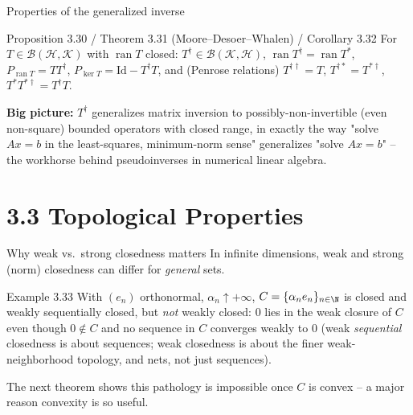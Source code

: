\documentclass[aspectratio=169,10pt]{beamer}
\newcommand{\Hil}{\mathcal{H}}
\newcommand{\Kil}{\mathcal{K}}
\newcommand{\Id}{\mathrm{Id}}
\newcommand{\ran}{\operatorname{ran}}
\begin{document}
\begin{frame}{Properties of the generalized inverse}
  \begin{block}{Proposition 3.30 / Theorem 3.31 (Moore--Desoer--Whalen) / Corollary 3.32}
    For $T\in\mathcal B(\Hil,\Kil)$ with $\ran T$ closed: $T^\dagger \in
    \mathcal B(\Kil,\Hil)$, $\ran T^\dagger = \ran T^*$,
    $P_{\ran T}=TT^\dagger$, $P_{\ker T} = \Id - T^\dagger T$, and (Penrose
    relations) $T^{\dagger\dagger}=T$, $T^{\dagger *}=T^{*\dagger}$,
    $T^*T^{*\dagger}=T^\dagger T$.
  \end{block}
  \textbf{Big picture:} $T^\dagger$ generalizes matrix inversion to
  possibly-non-invertible (even non-square) bounded operators with closed
  range, in exactly the way "solve $Ax=b$ in the least-squares,
  minimum-norm sense" generalizes "solve $Ax=b$" -- the workhorse behind
  pseudoinverses in numerical linear algebra.
\end{frame}

\section{3.3 Topological Properties}

\begin{frame}{Why weak vs.\ strong closedness matters}
  In infinite dimensions, weak and strong (norm) closedness can differ for
  \emph{general} sets.
  \begin{block}{Example 3.33}
    With $(e_n)$ orthonormal, $\alpha_n\uparrow+\infty$,
    $C=\{\alpha_ne_n\}_{n\in\N}$ is closed and weakly sequentially closed,
    but \emph{not} weakly closed: $0$ lies in the weak closure of $C$ even
    though $0\notin C$ and no sequence in $C$ converges weakly to $0$ (weak
    \emph{sequential} closedness is about sequences; weak closedness is
    about the finer weak-neighborhood topology, and nets, not just
    sequences).
  \end{block}
  The next theorem shows this pathology is impossible once $C$ is convex --
  a major reason convexity is so useful.
\end{frame}
\end{document}
